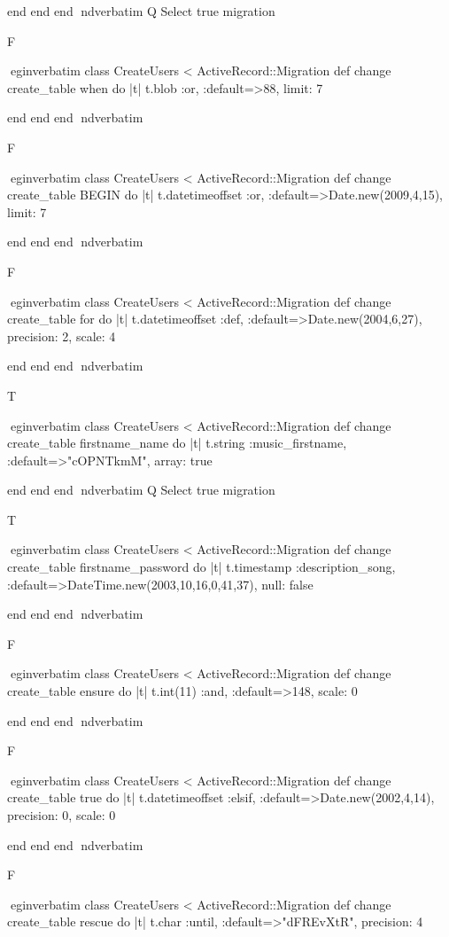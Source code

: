     end 
  end 
end
nd{verbatim}
Q
 Select true migration

F

egin{verbatim}
 class CreateUsers < ActiveRecord::Migration 
  def change 
    create_table when do |t| 
      t.blob :or, :default=>88, limit: 7
    
    end 
  end 
end
nd{verbatim}

F

egin{verbatim}
 class CreateUsers < ActiveRecord::Migration 
  def change 
    create_table BEGIN do |t| 
      t.datetimeoffset :or, :default=>Date.new(2009,4,15), limit: 7
    
    end 
  end 
end
nd{verbatim}

F

egin{verbatim}
 class CreateUsers < ActiveRecord::Migration 
  def change 
    create_table for do |t| 
      t.datetimeoffset :def, :default=>Date.new(2004,6,27), precision: 2, scale: 4
    
    end 
  end 
end
nd{verbatim}

T

egin{verbatim}
 class CreateUsers < ActiveRecord::Migration 
  def change 
    create_table firstname_name do |t| 
      t.string :music_firstname, :default=>"cOPNTkmM", array: true
    
    end 
  end 
end
nd{verbatim}
Q
 Select true migration

T

egin{verbatim}
 class CreateUsers < ActiveRecord::Migration 
  def change 
    create_table firstname_password do |t| 
      t.timestamp :description_song, :default=>DateTime.new(2003,10,16,0,41,37), null: false
    
    end 
  end 
end
nd{verbatim}

F

egin{verbatim}
 class CreateUsers < ActiveRecord::Migration 
  def change 
    create_table ensure do |t| 
      t.int(11) :and, :default=>148, scale: 0
    
    end 
  end 
end
nd{verbatim}

F

egin{verbatim}
 class CreateUsers < ActiveRecord::Migration 
  def change 
    create_table true do |t| 
      t.datetimeoffset :elsif, :default=>Date.new(2002,4,14), precision: 0, scale: 0
    
    end 
  end 
end
nd{verbatim}

F

egin{verbatim}
 class CreateUsers < ActiveRecord::Migration 
  def change 
    create_table rescue do |t| 
      t.char :until, :default=>"dFREvXtR", precision: 4
    
